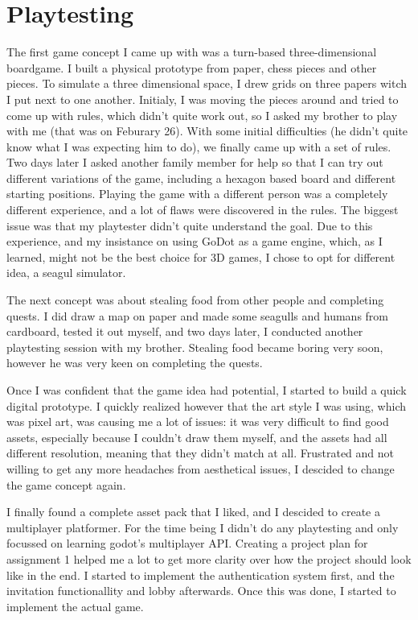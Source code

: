 \documentclass{article}
\begin{document}
\section{Playtesting}
The first game concept I came up with was a turn-based three-dimensional boardgame. I built a physical prototype from paper, chess pieces and other pieces. To simulate a three dimensional space, I drew grids on three papers witch I put next to one another. Initialy, I was moving the pieces around and tried to come up with rules, which didn't quite work out, so I asked my brother to play with me (that was on Feburary 26). With some initial difficulties (he didn't quite know what I was expecting him to do), we finally came up with a set of rules. Two days later I asked another family member for help so that I can try out different variations of the game, including a hexagon based board and different starting positions. Playing the game with a different person was a completely different experience, and a lot of flaws were discovered in the rules. The biggest issue was that my playtester didn't quite understand the goal. Due to this experience, and my insistance on using GoDot as a game engine, which, as I learned, might not be the best choice for 3D games, I chose to opt for different idea, a seagul simulator.

\bigskip
The next concept was about stealing food from other people and completing quests. I did draw a map on paper and made some seagulls and humans from cardboard, tested it out myself, and two days later, I conducted another playtesting session with my brother. Stealing food became boring very soon, however he was very keen on completing the quests. 

Once I was confident that the game idea had potential, I started to build a quick digital prototype. I quickly realized however that the art style I was using, which was pixel art, was causing me a lot of issues: it was very difficult to find good assets, especially because I couldn't draw them myself, and the assets had all different resolution, meaning that they didn't match at all. Frustrated and not willing to get any more headaches from aesthetical issues, I descided to change the game concept again.

\bigskip
I finally found a complete asset pack that I liked, and I descided to create a multiplayer platformer. For the time being I didn't do any playtesting and only focussed on learning godot's multiplayer API. Creating a project plan for assignment 1 helped me a lot to get more clarity over how the project should look like in the end. I started to implement the authentication system first, and the invitation functionallity and lobby afterwards. Once this was done, I started to implement the actual game. 
\end{document}
